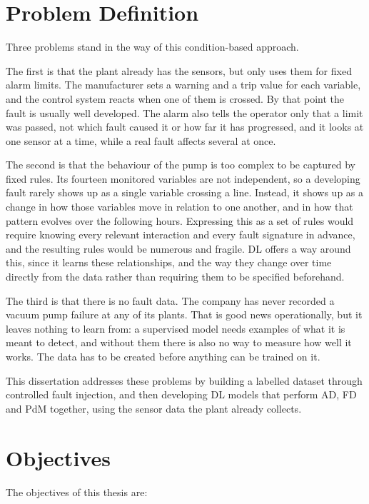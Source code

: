 \section{Problem Definition} \label{sec:problem}

Three problems stand in the way of this condition-based approach.

The first is that the plant already has the sensors, but only uses them for fixed alarm limits. The
manufacturer sets a warning and a trip value for each variable, and the control system reacts when one of
them is crossed. By that point the fault is usually well developed. The alarm also tells the operator only
that a limit was passed, not which fault caused it or how far it has progressed, and it looks at one
sensor at a time, while a real fault affects several at once.

The second is that the behaviour of the pump is too complex to be captured by fixed rules. Its fourteen
monitored variables are not independent, so a developing fault rarely shows up as a single variable
crossing a line. Instead, it shows up as a change in how those variables move in relation to one another,
and in how that pattern evolves over the following hours. Expressing this as a set of rules would require
knowing every relevant interaction and every fault signature in advance, and the resulting rules would be
numerous and fragile. DL offers a way around this, since it learns these relationships, and the
way they change over time directly from the data rather than requiring them to be specified beforehand.

The third is that there is no fault data. The company has never recorded a vacuum pump failure at any of
its plants. That is good news operationally, but it leaves nothing to learn from: a supervised model needs
examples of what it is meant to detect, and without them there is also no way to measure how well it
works. The data has to be created before anything can be trained on it.

This dissertation addresses these problems by building a labelled dataset through controlled fault
injection, and then developing DL models that perform AD, FD and
PdM together, using the sensor data the plant already collects.

\section{Objectives} \label{sec:objectives}

The objectives of this thesis are:

